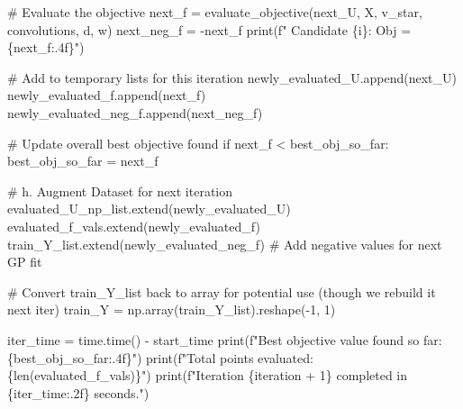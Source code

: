 \documentclass[
  letterpaper,
  DIV=11,
  numbers=noendperiod]{scrartcl}
\newenvironment{Shaded}{\begin{snugshade}}{\end{snugshade}}
\newcommand{\BuiltInTok}[1]{\textcolor[rgb]{0.00,0.23,0.31}{#1}}
\newcommand{\CommentTok}[1]{\textcolor[rgb]{0.37,0.37,0.37}{#1}}
\newcommand{\ControlFlowTok}[1]{\textcolor[rgb]{0.00,0.23,0.31}{#1}}
\newcommand{\DecValTok}[1]{\textcolor[rgb]{0.68,0.00,0.00}{#1}}
\newcommand{\NormalTok}[1]{\textcolor[rgb]{0.00,0.23,0.31}{#1}}
\newcommand{\OperatorTok}[1]{\textcolor[rgb]{0.37,0.37,0.37}{#1}}
\newcommand{\SpecialCharTok}[1]{\textcolor[rgb]{0.37,0.37,0.37}{#1}}
\newcommand{\SpecialStringTok}[1]{\textcolor[rgb]{0.13,0.47,0.30}{#1}}
\begin{document}
\begin{Shaded}
\begin{Highlighting}[]
        \CommentTok{\# Evaluate the objective}
\NormalTok{        next\_f }\OperatorTok{=}\NormalTok{ evaluate\_objective(next\_U, X, v\_star, convolutions, d, w)}
\NormalTok{        next\_neg\_f }\OperatorTok{=} \OperatorTok{{-}}\NormalTok{next\_f}
        \BuiltInTok{print}\NormalTok{(}\SpecialStringTok{f"  Candidate }\SpecialCharTok{\{}\NormalTok{i}\SpecialCharTok{\}}\SpecialStringTok{: Obj = }\SpecialCharTok{\{}\NormalTok{next\_f}\SpecialCharTok{:.4f\}}\SpecialStringTok{"}\NormalTok{)}

        \CommentTok{\# Add to temporary lists for this iteration}
\NormalTok{        newly\_evaluated\_U.append(next\_U)}
\NormalTok{        newly\_evaluated\_f.append(next\_f)}
\NormalTok{        newly\_evaluated\_neg\_f.append(next\_neg\_f)}

        \CommentTok{\# Update overall best objective found}
        \ControlFlowTok{if}\NormalTok{ next\_f }\OperatorTok{\textless{}}\NormalTok{ best\_obj\_so\_far:}
\NormalTok{            best\_obj\_so\_far }\OperatorTok{=}\NormalTok{ next\_f}

    \CommentTok{\# h. Augment Dataset for next iteration}
\NormalTok{    evaluated\_U\_np\_list.extend(newly\_evaluated\_U)}
\NormalTok{    evaluated\_f\_vals.extend(newly\_evaluated\_f)}
\NormalTok{    train\_Y\_list.extend(newly\_evaluated\_neg\_f) }\CommentTok{\# Add negative values for next GP fit}

    \CommentTok{\# Convert train\_Y\_list back to array for potential use (though we rebuild it next iter)}
\NormalTok{    train\_Y }\OperatorTok{=}\NormalTok{ np.array(train\_Y\_list).reshape(}\OperatorTok{{-}}\DecValTok{1}\NormalTok{, }\DecValTok{1}\NormalTok{)}

\NormalTok{    iter\_time }\OperatorTok{=}\NormalTok{ time.time() }\OperatorTok{{-}}\NormalTok{ start\_time}
    \BuiltInTok{print}\NormalTok{(}\SpecialStringTok{f"Best objective value found so far: }\SpecialCharTok{\{}\NormalTok{best\_obj\_so\_far}\SpecialCharTok{:.4f\}}\SpecialStringTok{"}\NormalTok{)}
    \BuiltInTok{print}\NormalTok{(}\SpecialStringTok{f"Total points evaluated: }\SpecialCharTok{\{}\BuiltInTok{len}\NormalTok{(evaluated\_f\_vals)}\SpecialCharTok{\}}\SpecialStringTok{"}\NormalTok{)}
    \BuiltInTok{print}\NormalTok{(}\SpecialStringTok{f"Iteration }\SpecialCharTok{\{}\NormalTok{iteration }\OperatorTok{+} \DecValTok{1}\SpecialCharTok{\}}\SpecialStringTok{ completed in }\SpecialCharTok{\{}\NormalTok{iter\_time}\SpecialCharTok{:.2f\}}\SpecialStringTok{ seconds."}\NormalTok{)}



\end{Highlighting}
\end{Shaded}
\end{document}
